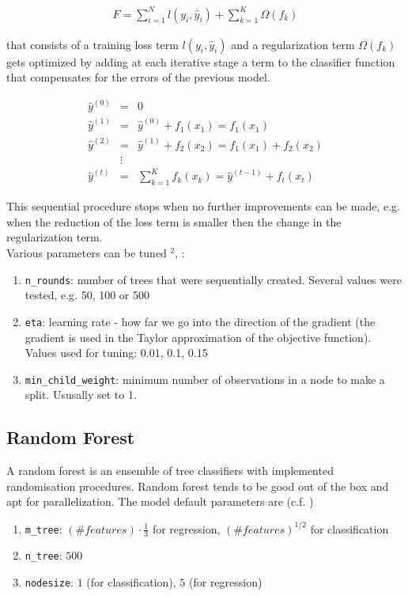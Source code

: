 \documentclass[a4paper,12pt]{article}
\begin{document}
\begin{eqnarray*}
F = \displaystyle\sum_{i=1}^{N} l(y_i, \hat{y}_i) + \displaystyle\sum_{k=1}^{K} \Omega(f_k) 
\end{eqnarray*}

that consists of a training loss term $l(y_i,\hat{y}_i)$ and a regularization term $\Omega(f_k)$ gets optimized by adding at each iterative stage a term to the classifier function that compensates for the errors of the previous model. 

\begin{eqnarray*}
\hat{y}^{(0)} &=& 0       \\
\hat{y}^{(1)} &=& \hat{y}^{(0)} + f_1(x_1) =  f_1(x_1)   \\
\hat{y}^{(2)} &=& \hat{y}^{(1)}+f_2(x_2) = f_1(x_1) + f_2(x_2) \\
&\vdots& \\
\hat{y}^{(t)} &=& \displaystyle\sum_{k=1}^{K} f_k(x_k) = \hat{y}^{(t-1)} + f_t(x_t)
\end{eqnarray*}

This sequential procedure stops when no further improvements can be made, e.g. when the reduction of the loss term is smaller then the change in the regularization term. \\

Various parameters can be tuned $^2$, : 
\begin{enumerate}
\item \texttt{n\_rounds}: number of trees that were sequentially created. Several values were tested, e.g. 50, 100 or 500
\item \texttt{eta}: learning rate - how far we go into the direction of the gradient (the gradient is used in the Taylor approximation of the objective function). Values used for tuning: 0.01, 0.1, 0.15
\item \texttt{min\_child\_weight}: minimum number of observations in a node to make a split. Ususally set to 1. 
\end{enumerate}

\subsection{Random Forest}
A random forest is an ensemble of tree classifiers with implemented
randomisation procedures.
Random forest tends to be good out of the box and apt for parallelization.
The model default parameters are (c.f. \cite{breiman2001random})
\begin{enumerate}
\item \texttt{m\_tree}:  $(\#features) \cdot \frac{1}{3} $ for regression,
$ (\#features)^{1/2}$ for classification
\item \texttt{n\_tree}:  $500$
\item \texttt{nodesize}: $1$ (for classification), $5$ (for regression)
\end{enumerate}
\end{document}
